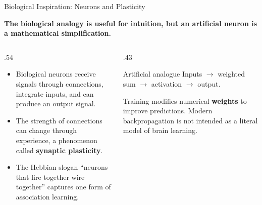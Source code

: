 \documentclass[aspectratio=169,10pt]{beamer}
\newcommand{\conceptlead}[1]{{\small\bfseries\color{CalPolyGreen}#1\par}}
\begin{document}
\begin{frame}[t]{Biological Inspiration: Neurons and Plasticity}
\small
\conceptlead{The biological analogy is useful for intuition, but an artificial neuron is a mathematical simplification.}
\begin{columns}[T,onlytextwidth]
 \begin{column}{.54\textwidth}
 \begin{itemize}
  \item Biological neurons receive signals through connections, integrate inputs, and can produce an output signal.
  \item The strength of connections can change through experience, a phenomenon called \textbf{synaptic plasticity}.
  \item The Hebbian slogan ``neurons that fire together wire together'' captures one form of association learning.
 \end{itemize}
 \end{column}
 \begin{column}{.43\textwidth}
 \begin{block}{Artificial analogue}
 Inputs $\longrightarrow$ weighted sum $\longrightarrow$ activation $\longrightarrow$ output.
 \par\medskip
 Training modifies numerical \textbf{weights} to improve predictions. Modern backpropagation is not intended as a literal model of brain learning.
 \end{block}
 \end{column}
\end{columns}
\end{frame}
\end{document}

